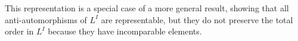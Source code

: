 \documentclass[12pt]{article}
\theoremstyle{plain}
\theoremstyle{remark}
\theoremstyle{definition}
\theoremstyle{proposition}
\begin{document}
This representation is a special case of a more general result, showing that all anti-automorphisms of $L^I$ are representable, but they do not preserve the total order in $L^I$ because they have incomparable elements.




%
%
%
%
%
%
%
%
%
%
%
\end{document}
